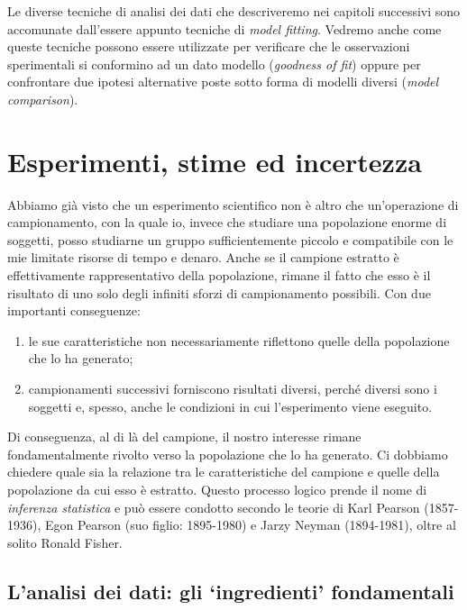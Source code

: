 \documentclass[a4paper,12pt,oneside]{book}
\providecommand{\tightlist}{%
  \setlength{\itemsep}{0pt}\setlength{\parskip}{0pt}}
\theoremstyle{definition}
\theoremstyle{definition}
\theoremstyle{definition}
\theoremstyle{remark}
\begin{document}
Le diverse tecniche di analisi dei dati che descriveremo nei capitoli
successivi sono accomunate dall'essere appunto tecniche di \emph{model
fitting}. Vedremo anche come queste tecniche possono essere utilizzate
per verificare che le osservazioni sperimentali si conformino ad un dato
modello (\emph{goodness of fit}) oppure per confrontare due ipotesi
alternative poste sotto forma di modelli diversi (\emph{model
comparison}).

\chapter{Esperimenti, stime ed
incertezza}\label{esperimenti-stime-ed-incertezza}

Abbiamo già visto che un esperimento scientifico non è altro che
un'operazione di campionamento, con la quale io, invece che studiare una
popolazione enorme di soggetti, posso studiarne un gruppo
sufficientemente piccolo e compatibile con le mie limitate risorse di
tempo e denaro. Anche se il campione estratto è effettivamente
rappresentativo della popolazione, rimane il fatto che esso è il
risultato di uno solo degli infiniti sforzi di campionamento possibili.
Con due importanti conseguenze:

\begin{enumerate}
\def\labelenumi{\arabic{enumi}.}
\tightlist
\item
  le sue caratteristiche non necessariamente riflettono quelle della
  popolazione che lo ha generato;
\item
  campionamenti successivi forniscono risultati diversi, perché diversi
  sono i soggetti e, spesso, anche le condizioni in cui l'esperimento
  viene eseguito.
\end{enumerate}

Di conseguenza, al di là del campione, il nostro interesse rimane
fondamentalmente rivolto verso la popolazione che lo ha generato. Ci
dobbiamo chiedere quale sia la relazione tra le caratteristiche del
campione e quelle della popolazione da cui esso è estratto. Questo
processo logico prende il nome di \emph{inferenza statistica} e può
essere condotto secondo le teorie di Karl Pearson (1857-1936), Egon
Pearson (suo figlio: 1895-1980) e Jarzy Neyman (1894-1981), oltre al
solito Ronald Fisher.

\section{\texorpdfstring{L'analisi dei dati: gli `ingredienti'
fondamentali}{L'analisi dei dati: gli ingredienti fondamentali}}\label{lanalisi-dei-dati-gli-ingredienti-fondamentali}
\end{document}
